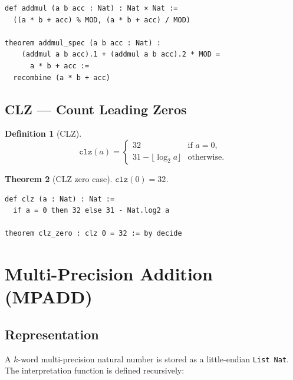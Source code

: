 \documentclass[11pt,a4paper]{article}
\newtheorem{theorem}{Theorem}[section]
\newtheorem{definition}[theorem]{Definition}
\begin{document}
\begin{lstlisting}[style=lean,caption={ADDMUL definition and correctness}]
def addmul (a b acc : Nat) : Nat × Nat :=
  ((a * b + acc) % MOD, (a * b + acc) / MOD)

theorem addmul_spec (a b acc : Nat) :
    (addmul a b acc).1 + (addmul a b acc).2 * MOD =
      a * b + acc :=
  recombine (a * b + acc)
\end{lstlisting}

\subsection{CLZ --- Count Leading Zeros}

\begin{definition}[CLZ]
\[
  \mathtt{clz}(a) =
  \begin{cases}
    32 & \text{if } a = 0, \\
    31 - \lfloor\log_2 a\rfloor & \text{otherwise}.
  \end{cases}
\]
\end{definition}

\begin{theorem}[CLZ zero case]
\label{thm:clz-zero}
$\mathtt{clz}(0) = 32$.
\end{theorem}

\begin{lstlisting}[style=lean,caption={CLZ definition and zero-case proof}]
def clz (a : Nat) : Nat :=
  if a = 0 then 32 else 31 - Nat.log2 a

theorem clz_zero : clz 0 = 32 := by decide
\end{lstlisting}

\section{Multi-Precision Addition (MPADD)}
\label{sec:mpadd}

\subsection{Representation}

A $k$-word multi-precision natural number is stored as a little-endian
\texttt{List Nat}.  The interpretation function is defined recursively:
\end{document}
